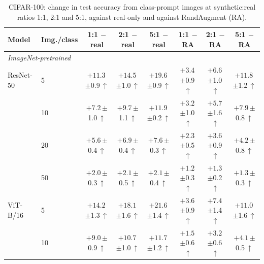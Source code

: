 \begin{table}[htbp]
\centering
\footnotesize
\setlength{\tabcolsep}{4pt}
\caption{CIFAR-100: change in test accuracy from class-prompt images at synthetic:real ratios 1:1, 2:1 and 5:1, against real-only and against RandAugment (RA).}
\label{tab:paper-ratio}
\begin{tabular}{llcccccc}
\toprule
Model & Img./class & \shortstack{1:1\\$-$real} & \shortstack{2:1\\$-$real} & \shortstack{5:1\\$-$real} & \shortstack{1:1\\$-$RA} & \shortstack{2:1\\$-$RA} & \shortstack{5:1\\$-$RA} \\
\midrule
\multicolumn{8}{l}{\textit{ImageNet-pretrained}} \\
ResNet-50 & 5 & $+11.3$\,{\scriptsize$\pm$0.9}\,$\uparrow$ & $+14.5$\,{\scriptsize$\pm$1.0}\,$\uparrow$ & $+19.6$\,{\scriptsize$\pm$0.9}\,$\uparrow$ & $+3.4$\,{\scriptsize$\pm$0.9}\,$\uparrow$ & $+6.6$\,{\scriptsize$\pm$1.0}\,$\uparrow$ & $+11.8$\,{\scriptsize$\pm$1.2}\,$\uparrow$ \\
 & 10 & $+7.2$\,{\scriptsize$\pm$1.0}\,$\uparrow$ & $+9.7$\,{\scriptsize$\pm$1.1}\,$\uparrow$ & $+11.9$\,{\scriptsize$\pm$0.2}\,$\uparrow$ & $+3.2$\,{\scriptsize$\pm$1.0}\,$\uparrow$ & $+5.7$\,{\scriptsize$\pm$1.6}\,$\uparrow$ & $+7.9$\,{\scriptsize$\pm$0.8}\,$\uparrow$ \\
 & 20 & $+5.6$\,{\scriptsize$\pm$0.4}\,$\uparrow$ & $+6.9$\,{\scriptsize$\pm$0.4}\,$\uparrow$ & $+7.6$\,{\scriptsize$\pm$0.3}\,$\uparrow$ & $+2.3$\,{\scriptsize$\pm$0.5}\,$\uparrow$ & $+3.6$\,{\scriptsize$\pm$0.9}\,$\uparrow$ & $+4.2$\,{\scriptsize$\pm$0.8}\,$\uparrow$ \\
 & 50 & $+2.0$\,{\scriptsize$\pm$0.3}\,$\uparrow$ & $+2.1$\,{\scriptsize$\pm$0.5}\,$\uparrow$ & $+2.1$\,{\scriptsize$\pm$0.4}\,$\uparrow$ & $+1.2$\,{\scriptsize$\pm$0.3}\,$\uparrow$ & $+1.3$\,{\scriptsize$\pm$0.2}\,$\uparrow$ & $+1.3$\,{\scriptsize$\pm$0.3}\,$\uparrow$ \\
\addlinespace[2pt]
ViT-B/16 & 5 & $+14.2$\,{\scriptsize$\pm$1.3}\,$\uparrow$ & $+18.1$\,{\scriptsize$\pm$1.6}\,$\uparrow$ & $+21.6$\,{\scriptsize$\pm$1.4}\,$\uparrow$ & $+3.6$\,{\scriptsize$\pm$0.9}\,$\uparrow$ & $+7.4$\,{\scriptsize$\pm$1.4}\,$\uparrow$ & $+11.0$\,{\scriptsize$\pm$1.6}\,$\uparrow$ \\
 & 10 & $+9.0$\,{\scriptsize$\pm$0.9}\,$\uparrow$ & $+10.7$\,{\scriptsize$\pm$1.0}\,$\uparrow$ & $+11.7$\,{\scriptsize$\pm$1.2}\,$\uparrow$ & $+1.5$\,{\scriptsize$\pm$0.6}\,$\uparrow$ & $+3.2$\,{\scriptsize$\pm$0.6}\,$\uparrow$ & $+4.1$\,{\scriptsize$\pm$0.5}\,$\uparrow$ \\

\end{tabular}
\end{table}
